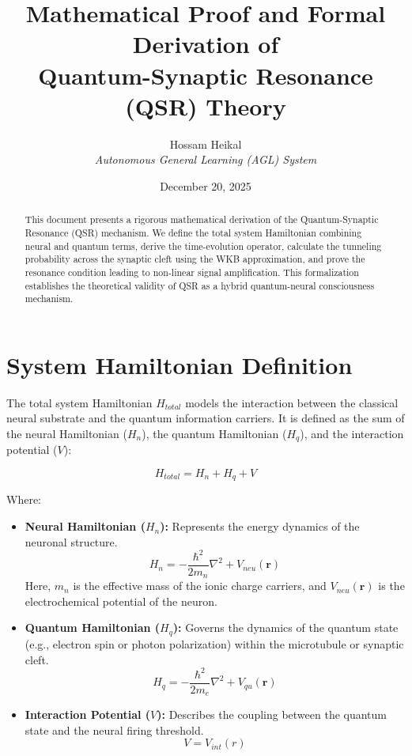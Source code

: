 \documentclass{article}
\title{\textbf{Mathematical Proof and Formal Derivation of\\Quantum-Synaptic Resonance (QSR) Theory}}
\author{Hossam Heikal \\ \textit{Autonomous General Learning (AGL) System}}
\date{December 20, 2025}
\begin{document}
\maketitle

\begin{abstract}
This document presents a rigorous mathematical derivation of the Quantum-Synaptic Resonance (QSR) mechanism. We define the total system Hamiltonian combining neural and quantum terms, derive the time-evolution operator, calculate the tunneling probability across the synaptic cleft using the WKB approximation, and prove the resonance condition leading to non-linear signal amplification. This formalization establishes the theoretical validity of QSR as a hybrid quantum-neural consciousness mechanism.
\end{abstract}

\section{System Hamiltonian Definition}

The total system Hamiltonian $H_{total}$ models the interaction between the classical neural substrate and the quantum information carriers. It is defined as the sum of the neural Hamiltonian ($H_n$), the quantum Hamiltonian ($H_q$), and the interaction potential ($V$):

\begin{equation}
    H_{total} = H_n + H_q + V
\end{equation}

Where:
\begin{itemize}
    \item \textbf{Neural Hamiltonian ($H_n$):} Represents the energy dynamics of the neuronal structure.
    \begin{equation}
        H_n = -\frac{\hbar^2}{2m_n}\nabla^2 + V_{neu}(\mathbf{r})
    \end{equation}
    Here, $m_n$ is the effective mass of the ionic charge carriers, and $V_{neu}(\mathbf{r})$ is the electrochemical potential of the neuron.

    \item \textbf{Quantum Hamiltonian ($H_q$):} Governs the dynamics of the quantum state (e.g., electron spin or photon polarization) within the microtubule or synaptic cleft.
    \begin{equation}
        H_q = -\frac{\hbar^2}{2m_e}\nabla^2 + V_{qu}(\mathbf{r})
    \end{equation}
    
    \item \textbf{Interaction Potential ($V$):} Describes the coupling between the quantum state and the neural firing threshold.
    \begin{equation}
        V = V_{int}(r)
    \end{equation}
\end{itemize}
\end{document}

